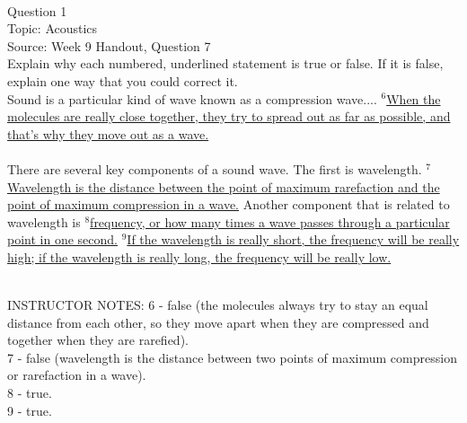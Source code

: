 \documentclass[12pt]{article}
\begin{document}
\begin{center}
\textbf{{\color{red}{\HUGE END OF EXAM}}}\\

\end{center}
\newpage

\begin{center}
\textbf{{\color{blue}{\HUGE START OF EXAM\\}}}

\textbf{{\color{blue}{\HUGE Student ID: 67535\\}}}

\textbf{{\color{blue}{\HUGE 4:30\\}}}

\end{center}
\newpage

{\large Question 1}\\

Topic: Acoustics\\
Source: Week 9 Handout, Question 7\\

Explain why each numbered, underlined statement is true or false. If it is false, explain one way that you could correct it.\\

Sound is a particular kind of wave known as a compression wave.... $^6$\ul{When the molecules are really close together, they try to spread out as far as possible, and that’s why they move out as a wave.}\\\\There are several key components of a sound wave. The first is wavelength. $^7$\ul{Wavelength is the distance between the point of maximum rarefaction and the point of maximum compression in a wave.} Another component that is related to wavelength is $^8$\ul{frequency, or how many times a wave passes through a particular point in one second.} $^9$\ul{If the wavelength is really short, the frequency will be really high; if the wavelength is really long, the frequency will be really low.} 


~\\
INSTRUCTOR NOTES: 6 - false (the molecules always try to stay an equal distance from each other, so they move apart when they are compressed and together when they are rarefied).\\7 - false (wavelength is the distance between two points of maximum compression or rarefaction in a wave).\\8 - true.\\9 - true.
\end{document}
